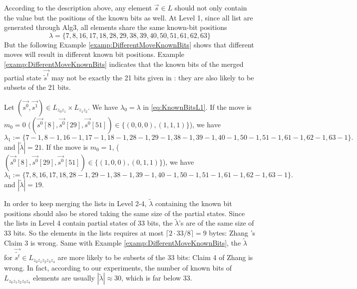 According to the description above, any element $\vec{s}\in L$ should not only contain the value but the  positions of the known bits as well.
At Level 1, since all list are generated through Alg3, all elements share the same known-bit positions
\begin{equation}\label{eq:KnownBitsL1}
\lambda=\{7,8,16,17,18,  28,29,38,39,40,  50,51,61,62,63\}
\end{equation}
But the following Example \ref{examp:DifferentMoveKnownBits} shows that different moves will result in different known bit positions.
Example \ref{examp:DifferentMoveKnownBits} indicates that the known bits of the merged partial state $\vec{\tilde{s}^t}$ may not be exactly the 21 bits given in \cite{AC:Zhang19}: they are also likely to be subsets of the 21 bits.
\begin{example}\label{examp:DifferentMoveKnownBits}
  Let $(\vec{s^0},\vec{s^1})\in L_{z_0z_1}\times L_{z_1z_2}$.
  We have $\lambda_0=\lambda$ in \eqref{eq:KnownBitsL1}.
  If the move is $m_0=0$ ($(\vec{s^0}[8], \vec{s^0}[29], \vec{s^0}[51])\in \{(0,0,0),(1,1,1)\}$), we have
  \[
  \lambda_1:=\{7-1,8-1,16-1,17-1,18-1,   28-1,29-1,38-1,39-1,40-1,  50-1,51-1,61-1,62-1,63-1  \}.
  \]
  and $|\tilde{\lambda}|=21$.
  If the move is $m_0=1$, ($(\vec{s^0}[8], \vec{s^0}[29], \vec{s^0}[51])\in \{(1,0,0),(0,1,1)\}$), we have
  \[
  \lambda_1:=\{7,8,16,17,18,   28-1,29-1,38-1,39-1,40-1,  50-1,51-1,61-1,62-1,63-1  \}.
  \]
    and $|\tilde{\lambda}|=19$.
\end{example}
In order to keep merging the lists in Level 2-4, $\tilde{\lambda}$ containing the known bit positions should also be stored taking the same size of the partial states.
Since the lists in Level 4 contain partial states of 33 bits, the $\tilde{\lambda}$'s are of the same size of 33 bits.
So the elements in the lists requires at most $\lceil 2\cdot 33/8\rceil=9$ bytes: Zhang \etal's Claim 3 is wrong.
Same with Example \ref{examp:DifferentMoveKnownBits}, the $\tilde{\lambda}$ for $\vec{\tilde{s^t}}\in L_{z_0z_1z_2z_3z_4}$ are more likely to be subsets of the 33 bits: Claim 4 of Zhang \etal is wrong.
In fact, according to our experiments, the number of known bits of $L_{z_0z_1z_2z_3z_4}$ elements are usually $|\tilde{\lambda}|\approx 30$, which is far below 33.

